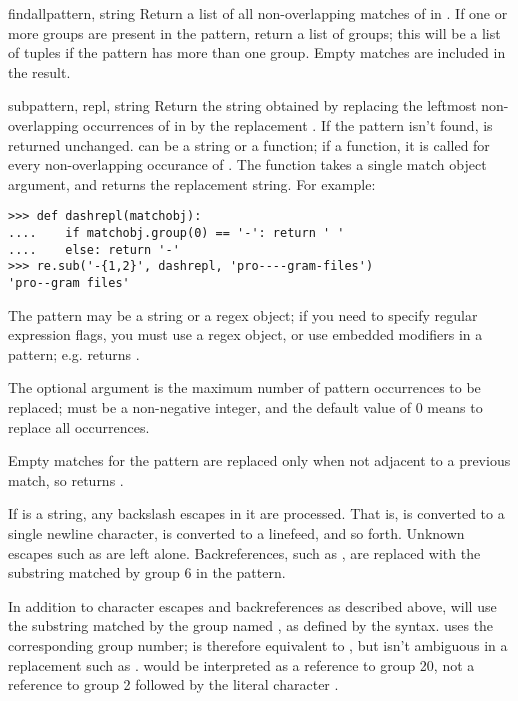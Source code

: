 \begin{funcdesc}{findall}{pattern, string}
Return a list of all non-overlapping matches of  in
.  If one or more groups are present in the pattern,
return a list of groups; this will be a list of tuples if the pattern
has more than one group.  Empty matches are included in the result.
\end{funcdesc}

\begin{funcdesc}{sub}{pattern, repl, string}
Return the string obtained by replacing the leftmost non-overlapping
occurrences of  in  by the replacement
.  If the pattern isn't found,  is returned
unchanged.   can be a string or a function; if a function,
it is called for every non-overlapping occurance of .
The function takes a single match object argument, and returns the
replacement string.  For example:

\begin{verbatim}
>>> def dashrepl(matchobj):
....    if matchobj.group(0) == '-': return ' '
....    else: return '-'
>>> re.sub('-{1,2}', dashrepl, 'pro----gram-files')
'pro--gram files'
\end{verbatim}

The pattern may be a string or a 
regex object; if you need to specify
regular expression flags, you must use a regex object, or use
embedded modifiers in a pattern; e.g.
 returns .

The optional argument  is the maximum number of pattern
occurrences to be replaced;  must be a non-negative integer, and
the default value of 0 means to replace all occurrences.

Empty matches for the pattern are replaced only when not adjacent to a
previous match, so  returns .

If  is a string, any backslash escapes in it are processed.
That is,  is converted to a single newline character,
 is converted to a linefeed, and so forth.  Unknown escapes
such as  are left alone.  Backreferences, such as , are
replaced with the substring matched by group 6 in the pattern. 

In addition to character escapes and backreferences as described
above,  will use the substring matched by the group
named , as defined by the  syntax.
 uses the corresponding group number;  is therefore equivalent to , but isn't ambiguous in a
replacement such as .   would be
interpreted as a reference to group 20, not a reference to group 2
followed by the literal character .  
\end{funcdesc}

